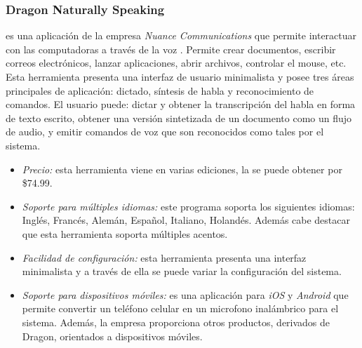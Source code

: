 \subsubsection{Dragon Naturally Speaking}
\label{sec:nuance}

 es una aplicaci\'on de la empresa \emph{Nuance Communications} que permite
interactuar con las computadoras a trav\'es de la voz \cite{DragonNaturallySpeaking}. Permite
crear documentos, escribir correos electr\'onicos, lanzar aplicaciones, abrir archivos, controlar
el mouse, etc. Esta herramienta presenta una interfaz de usuario minimalista y posee tres
\'areas principales de aplicaci\'on: dictado, s\'intesis de habla y reconocimiento de comandos. El
usuario puede: dictar y obtener la transcripci\'on del habla en forma de texto escrito, obtener
una versi\'on sintetizada de un documento como un flujo de audio, y emitir comandos de voz que
son reconocidos como tales por el sistema.

\begin{itemize}
    \item \emph{Precio:} esta herramienta viene en varias ediciones, la  se puede
	obtener por \$74.99.
    \item \emph{Soporte para m\'ultiples idiomas:} este programa soporta los siguientes idiomas: Ingl\'es, Franc\'es,
	Alem\'an, Espa\~nol, Italiano, Holand\'es. Adem\'as cabe destacar que esta herramienta soporta m\'ultiples
	acentos.
    \item \emph{Facilidad de configuraci\'on:} esta herramienta presenta una interfaz minimalista y a trav\'es de ella
	se puede variar la configuraci\'on del sistema.
    \item \emph{Soporte para dispositivos m\'oviles:}  es una aplicaci\'on para \emph{iOS} y
	\emph{Android} que permite convertir un tel\'efono celular en un microfono inal\'ambrico para el sistema. Adem\'as,
	la empresa  proporciona otros productos, derivados de Dragon, orientados a dispositivos
	m\'oviles.
\end{itemize}
